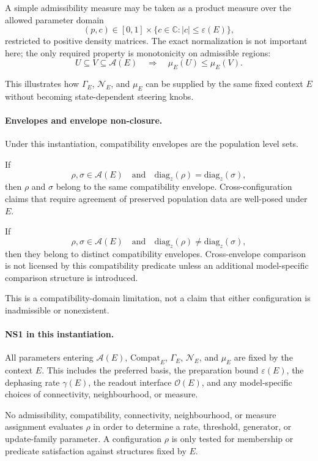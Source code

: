 \documentclass[aps,prx,onecolumn,11pt]{revtex4-2}
\theoremstyle{plain}
\theoremstyle{definition}
\theoremstyle{remark}
\begin{document}
A simple admissibility measure may be taken as a product measure over
the allowed parameter domain
\[
(p,c)\in[0,1]\times\{c\in\mathbb C:|c|\leq\varepsilon(E)\},
\]
restricted to positive density matrices. The exact normalization is not
important here; the only required property is monotonicity on admissible
regions:
\[
U\subseteq V\subseteq\mathcal A(E)
\quad\Longrightarrow\quad
\mu_E(U)\leq\mu_E(V).
\]

This illustrates how \(\Gamma_E\), \(\mathcal N_E\), and \(\mu_E\) can
be supplied by the same fixed context \(E\) without becoming
state-dependent steering knobs.

\paragraph{Envelopes and envelope non-closure.}

Under this instantiation, compatibility envelopes are the population
level sets.

If
\[
\rho,\sigma\in\mathcal A(E)
\quad\text{and}\quad
\mathrm{diag}_z(\rho)=\mathrm{diag}_z(\sigma),
\]
then \(\rho\) and \(\sigma\) belong to the same compatibility envelope.
Cross-configuration claims that require agreement of preserved
population data are well-posed under \(E\).

If
\[
\rho,\sigma\in\mathcal A(E)
\quad\text{and}\quad
\mathrm{diag}_z(\rho)\neq\mathrm{diag}_z(\sigma),
\]
then they belong to distinct compatibility envelopes. Cross-envelope
comparison is not licensed by this compatibility predicate unless an
additional model-specific comparison structure is introduced.

This is a compatibility-domain limitation, not a claim that either
configuration is inadmissible or nonexistent.

\paragraph{NS1 in this instantiation.}

All parameters entering \(\mathcal A(E)\), \(\mathrm{Compat}_E\),
\(\Gamma_E\), \(\mathcal N_E\), and \(\mu_E\) are fixed by the context
\(E\). This includes the preferred basis, the preparation bound
\(\varepsilon(E)\), the dephasing rate \(\gamma(E)\), the readout
interface \(\mathcal O(E)\), and any model-specific choices of
connectivity, neighbourhood, or measure.

No admissibility, compatibility, connectivity, neighbourhood, or measure
assignment evaluates \(\rho\) in order to determine a rate, threshold,
generator, or update-family parameter. A configuration \(\rho\) is only
tested for membership or predicate satisfaction against structures fixed
by \(E\).
\end{document}
